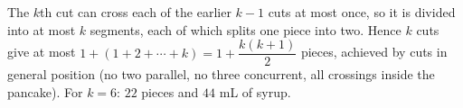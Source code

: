 The $k$th cut can cross each of the earlier $k-1$ cuts at most once, so it is divided into at most $k$ segments, each of which splits one piece into two. Hence $k$ cuts give at most $1+(1+2+\cdots+k)=1+\dfrac{k(k+1)}{2}$ pieces, achieved by cuts in general position (no two parallel, no three concurrent, all crossings inside the pancake). For $k=6$: $\boxed{22}$ pieces and $\boxed{44}$ mL of syrup.
